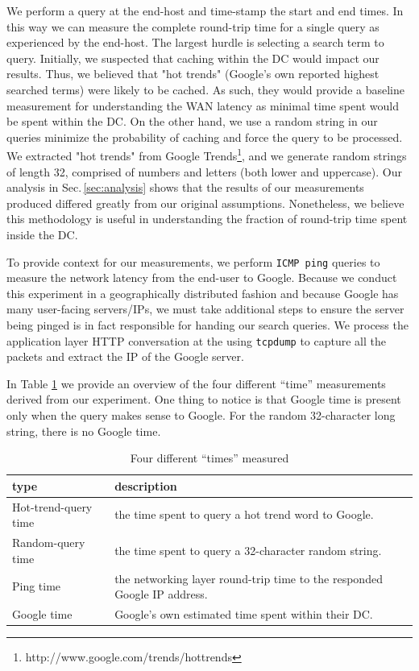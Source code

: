 We perform a query at the end-host and time-stamp the start and end times. In this way we can measure the complete round-trip time for a single query as experienced by the end-host. The largest hurdle is selecting a search term to query. Initially, we suspected that caching within the DC would impact our results. Thus, we believed that "hot trends" (Google's own reported highest searched terms) were likely to be cached. As such, they would provide a baseline measurement for understanding the WAN latency as minimal time spent would be spent within the DC. On the other hand, we use a random string in our  queries minimize the probability of caching and force the query to be processed. We extracted "hot trends" from Google Trends\footnote{http://www.google.com/trends/hottrends}, and we generate random strings of length 32, comprised of numbers and letters (both lower and uppercase). Our analysis in Sec.\,\ref{sec:analysis} shows that the results of our measurements produced differed greatly from our original assumptions. Nonetheless, we believe this methodology is useful in understanding the fraction of round-trip time spent inside the DC.

To provide context for our measurements, we perform \texttt{ICMP ping} queries to measure the network latency from the end-user to Google. Because we conduct this experiment in a geographically distributed fashion and because Google has many user-facing servers/IPs, we must take additional steps to ensure the server being pinged is in fact responsible for handing our search queries. We process the application layer HTTP conversation at the using \texttt{tcpdump} to capture all the packets and extract the IP of the Google server.
 
In Table \ref{tab:DC_method} we provide an overview of the four different ``time'' measurements derived from our experiment. One thing to notice is that Google time is present only when the query makes sense to Google. For the random 32-character long string, there is no Google time. 

\begin{table}
  \begin{tabular}{p{2.8cm} | p{5cm}}
    \hline
    type & description \\
    \hline
    Hot-trend-query time & the time spent to query a hot trend word to Google. \\
    Random-query time & the time spent to query a 32-character random string.  \\
    Ping time & the networking layer round-trip time to the responded Google IP address. \\
    Google time & Google's own estimated time spent within their DC. \\
    \hline
  \end{tabular}
  \vspace{1em}
  \caption{Four different ``times'' measured}
  \label{tab:DC_method}
\end{table}


